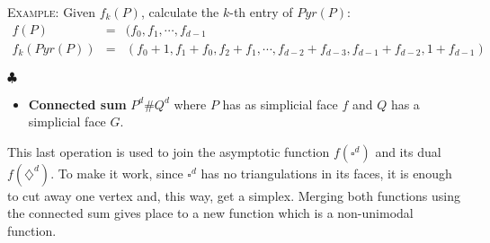 \bigskip
\noindent\textsc{Example}: Given $f_k(P)$, calculate the $k$-th entry of $Pyr(P)$:
\begin{eqnarray*}
f(P)&=&(f_0,f_1,\cdots, f_{d-1}\\
f_k(Pyr(P)) &=& (f_0 +1, f_1 + f_0, f_2+f_1, \cdots, f_{d-2}+ f_{d-3}, f_{d-1}+ f_{d-2}, 1+ f_{d-1})
\end{eqnarray*}
\begin{flushright}
$\clubsuit$
\end{flushright}

\bigskip
\begin{itemize}
\item  \textbf{Connected sum} $P^d\#Q^d$ where $P$ has as simplicial face $f$ and $Q$ has a simplicial face $G$. 
\end{itemize}

This last operation is used to join the asymptotic function $f(\square^d)$ and its dual $f(\diamondsuit ^d)$. To make it work, since $\square^d$ has no triangulations in its faces, it is enough to cut away one vertex and, this way, get a simplex. Merging both functions using the connected sum gives place to a new function which is a non-unimodal function.



